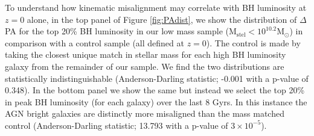 \documentclass[fleqn,usenatbib]{mnras}
\begin{document}

To understand how kinematic misalignment may correlate with BH luminosity at $z=0$ alone, in the top panel of Figure \ref{fig:PAdist}, we show the distribution of $\Delta$PA for the top 20\% BH luminosity in our low mass sample ($\mathrm{M_{stel} < 10^{10.2}M_{\odot}}$) in comparison with a control sample (all defined at $z=0$). The control is made by taking the closest unique match in stellar mass for each high BH luminosity galaxy from the remainder of our sample. We find the two distributions are statistically indistinguishable (Anderson-Darling statistic; -0.001 with a p-value of 0.348). In the bottom panel we show the same but instead we select the top 20\% in peak BH luminosity (for each galaxy) over the last 8 Gyrs. In this instance the AGN bright galaxies are distinctly more misaligned than the mass matched control (Anderson-Darling statistic; 13.793 with a p-value of $3 \times 10^{-5}$). 
\end{document}
